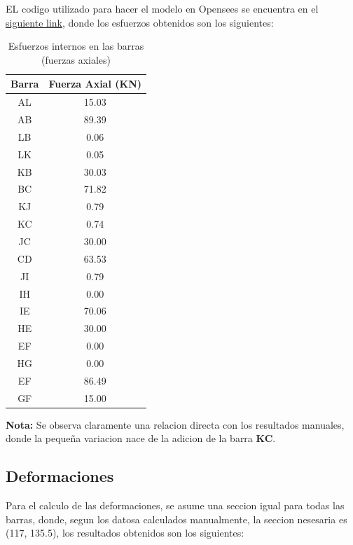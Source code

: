 EL codigo utilizado para hacer el modelo en Opensees se encuentra en el \href{https://github.com/LukasWolff2002/PROYECTO_3_MCOC/blob/main/CODIGO/OPENSEES/E0_Wolff.py}{siguiente link}, donde los esfuerzos obtenidos son los siguientes:

\begin{table}[H]
    \centering
    \caption{Esfuerzos internos en las barras (fuerzas axiales)}
    \label{tab:esfuerzos_internos}
    \begin{tabular}{|c|c|}
        \hline
        \textbf{Barra} & \textbf{Fuerza Axial (KN)} \\
        \hline
        AL & 15.03 \\
        AB & 89.39 \\
        LB & 0.06  \\
        LK & 0.05  \\
        KB & 30.03 \\
        BC & 71.82 \\
        KJ & 0.79  \\
        KC & 0.74  \\
        JC & 30.00 \\
        CD & 63.53 \\
        JI & 0.79  \\
        IH & 0.00  \\
        IE & 70.06 \\
        HE & 30.00 \\
        EF & 0.00  \\
        HG & 0.00  \\
        EF & 86.49 \\
        GF & 15.00 \\ \hline
    \end{tabular}
\end{table}

\textbf{Nota:} Se observa claramente una relacion directa con los resultados manuales, donde la pequeña variacion nace de la adicion de la barra \textbf{KC}.

\subsection{Deformaciones}

Para el calculo de las deformaciones, se asume una seccion igual para todas las barras, donde, segun los datosa calculados manualmente, la seccion nesesaria es (117, 135.5), los resultados obtenidos son los siguientes:

